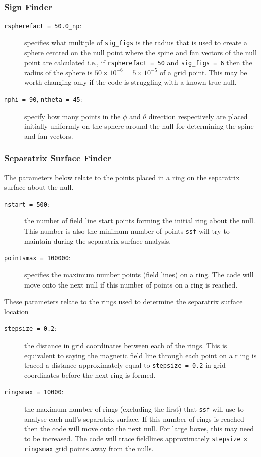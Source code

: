 \documentclass[12pt]{article}
\begin{document}
      \subsubsection{Sign Finder}
        \begin{description}
          \item [\texttt{rspherefact = 50.0\_np}:] specifies what multiple of \texttt{sig\_figs} is the radius that is used to create a sphere centred on the null point where the spine and fan vectors of the null point are calculated i.e., if \texttt{rspherefact = 50} and \texttt{sig\_figs = 6} then the radius of the sphere is  \( 50 \times 10^{-6} = 5\times 10^{-5} \) of a grid point. This may be worth changing only if the code is struggling with a known true null.
          \item [\texttt{nphi = 90}, \texttt{ntheta = 45}:] specify how many points in the \( \phi \) and \( \theta \) direction respectively are placed initially uniformly on the sphere around the null for determining the spine and fan vectors.
        \end{description}

      \subsubsection{Separatrix Surface Finder}
        The parameters below relate to the points placed in a ring on the separatrix surface about the null.
        \begin{description}
          \item [\texttt{nstart = 500}:] the number of field line start points forming the initial ring about the null. This number is also the minimum number of points \texttt{ssf} will try to maintain during the separatrix surface analysis.
          \item [\texttt{pointsmax = 100000}:] specifies the maximum number points (field lines) on a ring. The code will move onto the next null if this number of points on a ring is reached.
        \end{description}
        
        These parameters relate to the rings used to determine the separatrix surface location
        
        \begin{description}
          \item [\texttt{stepsize = 0.2}:] the distance in grid coordinates between each of the rings. This is equivalent to saying the magnetic field line through each point on a r     ing is traced a distance approximately equal to \texttt{stepsize = 0.2} in grid coordinates before the next ring is formed.
          \item [\texttt{ringsmax = 10000}:] the maximum number of rings (excluding the first) that \texttt{ssf} will use to analyse each null's separatrix surface. If this number of rings is reached then the code will move onto the next null. For large boxes, this may need to be increased. The code will trace fieldlines approximately \texttt{stepsize} \( \times \) \texttt{ringsmax} grid points away from the nulls.
        \end{description}
        
\end{document}

